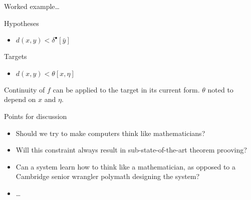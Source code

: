\begin{frame}{Worked example\ldots}
  \begin{block}{Hypotheses}
    \begin{itemize}
      \item $d(x, y) < \delta^\bullet[\bar{y}]$
    \end{itemize}
  \end{block}
  \begin{block}{Targets}
    \begin{itemize}
      \item $d(x, y) < \theta[x, \eta]$
    \end{itemize}
  \end{block}
  \begin{block}{}
    Continuity of $f$ can be applied to the target in its current form. $\theta$ noted to depend on $x$ and $\eta$.
  \end{block}
\end{frame}

\begin{frame}{Points for discussion}
  \begin{itemize}
    \item Should we try to make computers think like mathematicians?
    \vspace{2\baselineskip}
    \item Will this constraint always result in sub-state-of-the-art theorem prooving?
    \vspace{2\baselineskip}
    \item Can a system learn how to think like a mathematician, as opposed to a Cambridge senior wrangler polymath designing the system?
    \vspace{2\baselineskip}
    \item \ldots
  \end{itemize}
\end{frame}




